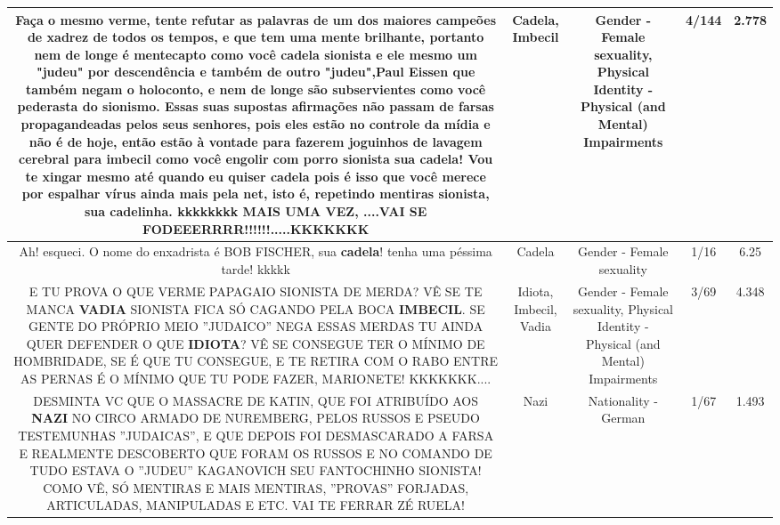 \documentclass[11pt]{article}
\newlength\mylength
\begin{document}
\begin{center}
\begin{longtable}{|C{.65\mylength}|C{.30\mylength}|C{.12\mylength}|C{.12\mylength}|C{.12\mylength}|}
  \small Faça o mesmo verme, tente refutar as palavras de um dos maiores campeões de xadrez de todos os tempos, e que tem uma mente brilhante, portanto nem de longe é mentecapto como você \textbf{cadela} sionista e ele mesmo um "judeu" por descendência e também de outro "judeu",Paul Eissen que também negam o holoconto, e nem de longe são subservientes como você pederasta do sionismo. Essas suas supostas afirmações não passam de farsas propagandeadas pelos seus senhores, pois eles estão no controle da mídia e não é de hoje, então estão à vontade para fazerem joguinhos de lavagem cerebral para \textbf{imbecil} como você engolir com porro sionista sua \textbf{cadela}! Vou te xingar mesmo até quando eu quiser \textbf{cadela} pois é isso que você merece por espalhar vírus ainda mais pela net, isto é,  repetindo mentiras sionista, sua cadelinha. kkkkkkkk MAIS UMA VEZ, ....VAI SE FODEEERRRR!!!!!!.....KKKKKKK\normalsize   & Cadela, Imbecil & Gender - Female sexuality, Physical Identity - Physical (and Mental) Impairments & 4/144 & 2.778 \\  \hline
  \small Ah! esqueci. O nome do enxadrista é BOB FISCHER, sua \textbf{cadela}! tenha uma péssima tarde! kkkkk\normalsize   & Cadela & Gender - Female sexuality & 1/16 & 6.25 \\  \hline
  \small E TU PROVA O QUE VERME PAPAGAIO SIONISTA DE MERDA? VÊ SE TE MANCA \textbf{VADIA} SIONISTA FICA SÓ CAGANDO PELA BOCA \textbf{IMBECIL}. SE GENTE DO PRÓPRIO MEIO ''JUDAICO'' NEGA ESSAS MERDAS TU AINDA QUER DEFENDER O QUE \textbf{IDIOTA}? VÊ SE CONSEGUE TER O MÍNIMO DE HOMBRIDADE, SE  É QUE TU CONSEGUE, E TE RETIRA COM O RABO ENTRE AS PERNAS É O MÍNIMO QUE TU PODE FAZER, MARIONETE! KKKKKKK....\normalsize   & Idiota, Imbecil, Vadia & Gender - Female sexuality, Physical Identity - Physical (and Mental) Impairments & 3/69 & 4.348 \\  \hline
  \small DESMINTA VC QUE O MASSACRE DE KATIN, QUE FOI ATRIBUÍDO AOS \textbf{NAZI} NO CIRCO ARMADO DE NUREMBERG, PELOS RUSSOS E PSEUDO TESTEMUNHAS ''JUDAICAS'', E QUE DEPOIS FOI DESMASCARADO A FARSA E REALMENTE DESCOBERTO QUE FORAM OS RUSSOS E NO COMANDO DE TUDO ESTAVA O ''JUDEU'' KAGANOVICH SEU FANTOCHINHO SIONISTA! COMO VÊ, SÓ MENTIRAS E MAIS MENTIRAS, ''PROVAS'' FORJADAS, ARTICULADAS, MANIPULADAS E ETC. VAI TE FERRAR ZÉ RUELA!\normalsize   & Nazi & Nationality - German & 1/67 & 1.493 \\  \hline

\end{longtable}
\end{center}
\end{document}
